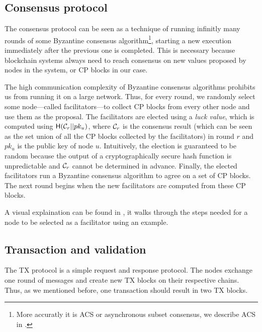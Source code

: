 \subsection{Consensus protocol}
\label{sec:overview-cons}

The consensus protocol can be seen as a technique of running infinitly many rounds of some 
Byzantine consensus algorithm\footnote{More accuratly it is ACS or asynchronous subset consensus, we describe ACS in .},
starting a new execution immediately after the previous one is completed.
This is necessary because blockchain systems always need to reach consensus on new values proposed by nodes in the system,
or CP blocks in our case.

The high communication complexity of Byzantine consensus algorithms prohibits us from running it on a large network.
Thus, for every round, we randomly select some node---called facilitators---to collect CP blocks from every other node and use them as the proposal.
The facilitators are elected using a \emph{luck value}, which is computed using $\textsf{H}(\mathcal{C}_r || pk_u)$,
where $\mathcal{C}_r$ is the consensus result 
(which can be seen as the set union of all the CP blocks collected by the facilitators)
in round $r$ and $pk_u$ is the public key of node $u$.
Intuitively, the election is guaranteed to be random 
because the output of a cryptographically secure hash function is unpredictable and $\mathcal{C}_r$ cannot be determined in advance.
Finally, the elected facilitators run a Byzantine consensus algorithm to agree on a set of CP blocks.
The next round begins when the new facilitators are computed from these CP blocks.

A visual explaination can be found in ,
it walks through the steps needed for a node to be selected as a facilitator using an example.

\subsection{Transaction and validation}
The TX protocol is a simple request and response protocol.
The nodes exchange one round of messages and create new TX blocks on their respective chains.
Thus, as we mentioned before, one transaction should result in two TX blocks.

